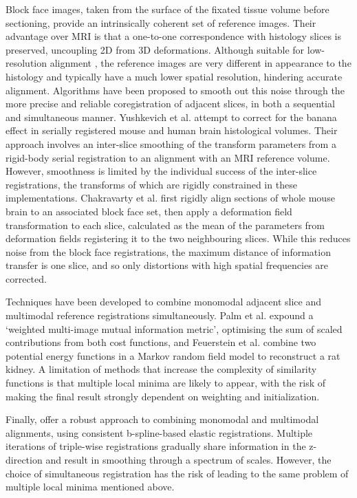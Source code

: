   Block face images, taken from the surface of the fixated tissue volume before sectioning, provide an intrinsically coherent set of reference images. Their advantage over MRI is that a one-to-one correspondence with histology slices is preserved, uncoupling 2D from 3D deformations. Although suitable for low-resolution alignment  \cite{Palm2010}, the reference images are very different in appearance to the histology and typically have a much lower spatial resolution, hindering accurate alignment. Algorithms have been proposed to smooth out this noise through the more precise and reliable coregistration of adjacent slices, in both a sequential \cite{Yushkevich2006,Chakravarty2008} and simultaneous \cite{Feuerstein2011} manner. Yushkevich et al. attempt to correct for the banana effect in serially registered mouse \cite{Yushkevich2006} and human \cite{Adler2012} brain histological volumes. Their approach involves an inter-slice smoothing of the transform parameters from a rigid-body serial registration to an alignment with an MRI reference volume. However, smoothness is limited by the individual success of the inter-slice registrations, the transforms of which are rigidly constrained in these implementations. Chakravarty et al. \cite{Chakravarty2008} first rigidly align sections of whole mouse brain to an associated block face set, then apply a deformation field transformation to each slice, calculated as the mean of the parameters from deformation fields registering it to the two neighbouring slices. While this reduces noise from the block face registrations, the maximum distance of information transfer is one slice, and so only distortions with high spatial frequencies are corrected.
  
  Techniques have been developed to combine monomodal adjacent slice and multimodal reference registrations simultaneously. Palm et al. \cite{Palm2008} expound a `weighted multi-image mutual information metric', optimising the sum of scaled contributions from both cost functions, and Feuerstein et al. \cite{Feuerstein2011} combine two potential energy functions in a Markov random field model to reconstruct a rat kidney. A limitation of methods that increase the complexity of similarity functions is that multiple local minima are likely to appear, with the risk of making the final result strongly dependent on weighting and initialization.
  
  Finally, \cite{Arganda-Carreras2010} offer a robust approach to combining monomodal and multimodal alignments, using consistent b-spline-based elastic registrations. Multiple iterations of triple-wise registrations gradually share information in the z-direction and result in smoothing through a spectrum of scales. However, the choice of simultaneous registration has the risk of leading to the same problem of multiple local minima mentioned above.
  
